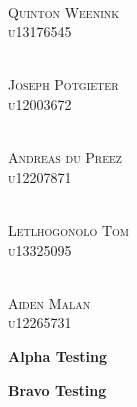 \documentclass{article}
\begin{document}
\begin{titlepage}
\begin{center}
\begin{multicols}{2}
	\columnbreak
	
	\textsc{\large\\
		Quinton Weenink\\
		u13176545\\
	}
	
	\textsc{\large\\
		Joseph Potgieter\\
		u12003672\\
	}
	
	\textsc{\large\\
		Andreas du Preez\\
		u12207871\\
	}
	
	\textsc{\large\\
		Letlhogonolo Tom\\
		u13325095\\
	}
	
	\textsc{\large\\
		Aiden Malan\\
		u12265731\\
	}
					
	\end{multicols}
	
	\end{center}
\end{titlepage}

\tableofcontents
\thispagestyle{empty}
\cleardoublepage

\setcounter{page}{1}

   \vspace*{\fill}
   \begin{center}
	\Huge \textbf{Alpha Testing}
   \end{center}
   \vspace*{\fill}

	\newpage
	
	\vspace*{\fill}
	\begin{center}
	   	\Huge \textbf{Bravo Testing}
	\end{center}
	\vspace*{\fill}
\end{document}
